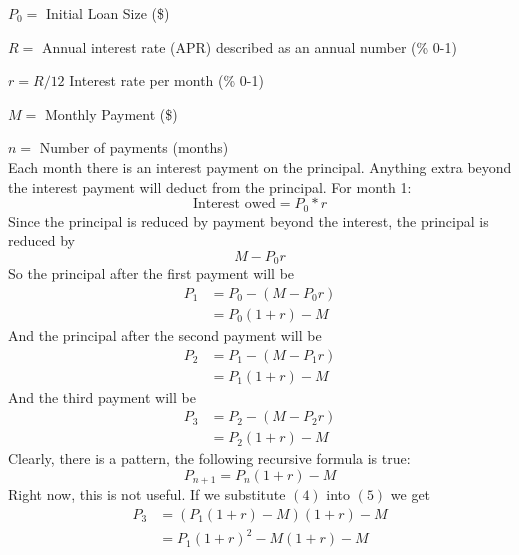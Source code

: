 \documentclass{article}
\begin{document}
\begin{flushleft}
$P_0=$ Initial Loan Size (\$)

$R=$ Annual interest rate (APR) described as an annual number (\% 0-1)

$r=R/12$ Interest rate per month (\% 0-1)

$M=$ Monthly Payment (\$)

$n=$ Number of payments (months) \\
\vspace{5mm}
Each month there is an interest payment on the principal. Anything extra beyond the interest payment will deduct from the principal. For month 1:
\begin{equation}
\textrm{Interest owed} = P_0 * r
\end{equation}
Since the principal is reduced by payment beyond the interest, the principal is reduced by 
\begin{equation}
M-P_0 r
\end{equation}
So the principal after the first payment will be 
\begin{equation}
\begin{aligned}
P_1 &= P_0 - (M - P_0 r) \\
& = P_0 (1+r) - M
\end{aligned}
\end{equation}
And the principal after the second payment will be
\begin{equation}
\begin{aligned}
P_2 &= P_1 - (M - P_1 r) \\
&= P_1 (1+r) - M
\end{aligned}
\end{equation}
And the third payment will be
\begin{equation}
\begin{aligned}
P_3 &= P_2 - (M - P_2 r) \\
&= P_2 (1+r) - M
\end{aligned}
\end{equation}
Clearly, there is a pattern, the following recursive formula is true:
\begin{equation}
P_{n + 1} = P_n (1 + r) - M
\end{equation}
Right now, this is not useful. If we substitute $(4)$ into $(5)$ we get
\begin{equation}
\begin{aligned}
P_3 & = (P_1 (1 + r) - M)(1 + r) - M \\
& = P_1 (1 + r)^2 - M(1 + r) - M
\end{aligned}

\end{equation}
\end{flushleft}
\end{document}

